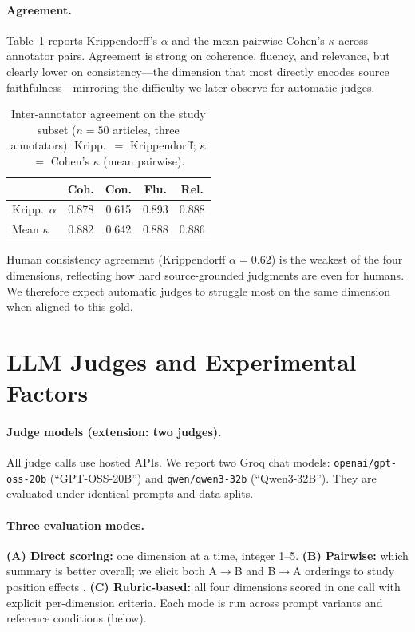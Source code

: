 \documentclass[11pt]{article}
\begin{document}
\paragraph{Agreement.}
Table~\ref{tab:iaa} reports Krippendorff's $\alpha$ and the mean pairwise Cohen's $\kappa$ across annotator pairs. Agreement is strong on coherence, fluency, and relevance, but clearly lower on consistency---the dimension that most directly encodes source faithfulness---mirroring the difficulty we later observe for automatic judges.

\begin{table}[t]
\centering
\footnotesize
\setlength{\tabcolsep}{3pt}
\begin{tabular}{@{}lcccc@{}}
\toprule
 & Coh. & Con. & Flu. & Rel. \\
\midrule
Kripp.\ $\alpha$ & 0.878 & 0.615 & 0.893 & 0.888 \\
Mean $\kappa$ & 0.882 & 0.642 & 0.888 & 0.886 \\
\bottomrule
\end{tabular}
\caption{Inter-annotator agreement on the study subset ($n{=}50$ articles, three annotators). Kripp.\ $=$ Krippendorff; $\kappa$ $=$ Cohen's $\kappa$ (mean pairwise).}
\label{tab:iaa}
\end{table}

Human consistency agreement (Krippendorff $\alpha{=}0.62$) is the weakest of the four dimensions, reflecting how hard source-grounded judgments are even for humans. We therefore expect automatic judges to struggle most on the same dimension when aligned to this gold.

\section{LLM Judges and Experimental Factors}
\label{sec:judges}

\paragraph{Judge models (extension: two judges).}
All judge calls use hosted APIs. We report two Groq chat models: \texttt{openai/gpt-oss-20b} (``GPT-OSS-20B'') and \texttt{qwen/qwen3-32b} (``Qwen3-32B''). They are evaluated under identical prompts and data splits.

\paragraph{Three evaluation modes.}
\textbf{(A) Direct scoring:} one dimension at a time, integer 1--5. \textbf{(B) Pairwise:} which summary is better overall; we elicit both A$\rightarrow$B and B$\rightarrow$A orderings to study position effects \citep{wang2024largebench,zheng2023judging}. \textbf{(C) Rubric-based:} all four dimensions scored in one call with explicit per-dimension criteria. Each mode is run across prompt variants and reference conditions (below).
\end{document}
